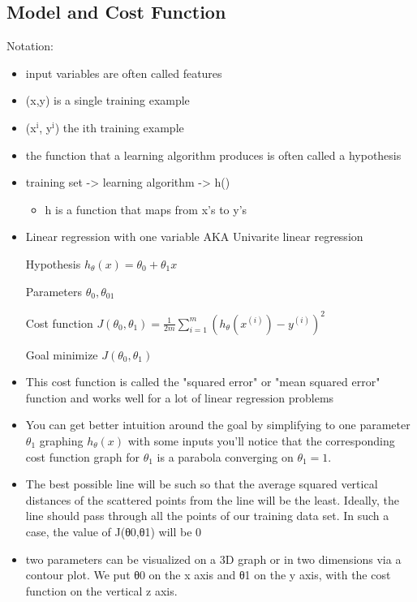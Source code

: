 \documentclass[11pt]{article}
\begin{document}
\subsection{Model and Cost Function}
\label{sec:org4e0261a}
Notation:
\begin{itemize}
\item input variables are often called features
\item (x,y) is a single training example
\item (x\(^{\text{i}}\), y\(^{\text{i}}\)) the ith training example
\item the function that a learning algorithm produces is often called a hypothesis
\item training set -> learning algorithm -> h()
\begin{itemize}
\item h is a function that maps from x's to y's
\end{itemize}
\item Linear regression with one variable AKA Univarite linear regression

\item[{Hypothesis}] \(h_{\theta}(x) = \theta_{0} + \theta_{1}x\)
\item[{Parameters}] \(\theta_{0},\theta_{01}\)
\item[{Cost function}] \(J(\theta_{0},\theta_{1}) = \frac{1}{2m}\sum\limits_{i=1}^{m}(h_{\theta}(x^{(i)})-y^{(i)})^2\)
\item[{Goal}] minimize \(J(\theta_{0},\theta_{1})\)
\item This cost function is called the "squared error" or "mean squared
error" function and works well for a lot of linear regression
problems
\item You can get better intuition around the goal by simplifying to one
parameter \(\theta_{1}\) graphing \(h_{\theta}(x)\) with some inputs
you'll notice that the corresponding cost function graph for
\(\theta_{1}\) is a parabola converging on \(\theta_{1} = 1\).
\item The best possible line will be such so that the average squared
vertical distances of the scattered points from the line will be the
least. Ideally, the line should pass through all the points of our
training data set. In such a case, the value of J(θ0,θ1) will be 0
\item two parameters can be visualized on a 3D graph or in two dimensions
via a contour plot. We put θ0 on the x axis and θ1 on the y axis,
with the cost function on the vertical z axis.
\end{itemize}
\end{document}
